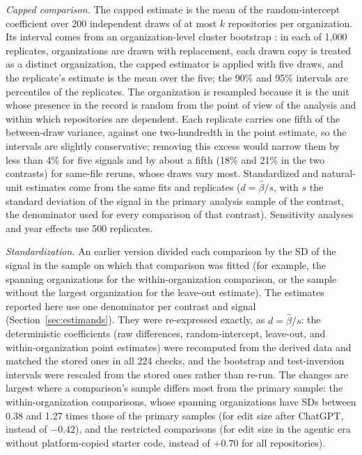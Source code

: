 \documentclass[acmsmall,screen,review,anonymous]{acmart}
\begin{document}
\textit{Capped comparison.} The capped estimate is the mean of the random-intercept coefficient over 200 independent draws of at most $k$ repositories per organization. Its interval comes from an organization-level cluster bootstrap \citep{cameron2008bootstrap, cameron2015practitioner}: in each of 1,000 replicates, organizations are drawn with replacement, each drawn copy is treated as a distinct organization, the capped estimator is applied with five draws, and the replicate's estimate is the mean over the five; the 90\% and 95\% intervals are percentiles of the replicates. The organization is resampled because it is the unit whose presence in the record is random from the point of view of the analysis and within which repositories are dependent. Each replicate carries one fifth of the between-draw variance, against one two-hundredth in the point estimate, so the intervals are slightly conservative; removing this excess would narrow them by less than 4\% for five signals and by about a fifth (18\% and 21\% in the two contrasts) for same-file reruns, whose draws vary most. Standardized and natural-unit estimates come from the same fits and replicates ($d = \hat\beta / s$, with $s$ the standard deviation of the signal in the primary analysis sample of the contrast, the denominator used for every comparison of that contrast). Sensitivity analyses and year effects use 500 replicates.

\textit{Standardization.} An earlier version divided each comparison by the SD of the signal in the sample on which that comparison was fitted (for example, the spanning organizations for the within-organization comparison, or the sample without the largest organization for the leave-out estimate). The estimates reported here use one denominator per contrast and signal (Section~\ref{sec:estimands}). They were re-expressed exactly, as $d = \hat\beta / s$: the deterministic coefficients (raw differences, random-intercept, leave-out, and within-organization point estimates) were recomputed from the derived data and matched the stored ones in all 224 checks, and the bootstrap and test-inversion intervals were rescaled from the stored ones rather than re-run. The changes are largest where a comparison's sample differs most from the primary sample: the within-organization comparisons, whose spanning organizations have SDs between 0.38 and 1.27 times those of the primary samples (for edit size after ChatGPT,  instead of $-0.42$), and the restricted comparisons (for edit size in the agentic era without platform-copied starter code,  instead of $+0.70$ for all repositories).
\end{document}

